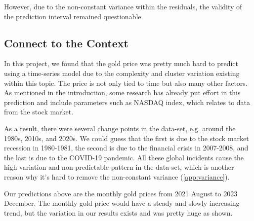 \documentclass[paper=letter, fontsize=11pt]{scrartcl}
\begin{document}
However, due to the non-constant variance within the residuals, the validity of the prediction interval remained questionable.

\subsection{Connect to the Context}

In this project, we found that the gold price was pretty much hard to predict using a time-series model due to the complexity and cluster variation existing within this topic. The price is not only tied to time but also many other factors. As mentioned in the introduction, some research has already put effort in this prediction and include parameters such as NASDAQ index, which relates to data from the stock market.

As a result, there were several change points in the data-set, e.g. around the 1980s, 2010s, and 2020s. We could guess that the first is due to the stock market recession in 1980-1981, the second is due to the financial crisis in 2007-2008, and the last is due to the COVID-19 pandemic. All these global incidents cause the high variation and non-predictable pattern in the data-set, which is another reason why it's hard to remove the non-constant variance (\ref{app:variance}).

Our predictions above are the monthly gold prices from 2021 August to 2023 December. The monthly gold price would have a steady and slowly increasing trend, but the variation in our results exists and was pretty huge as shown.






\clearpage
\appendix
\end{document}
